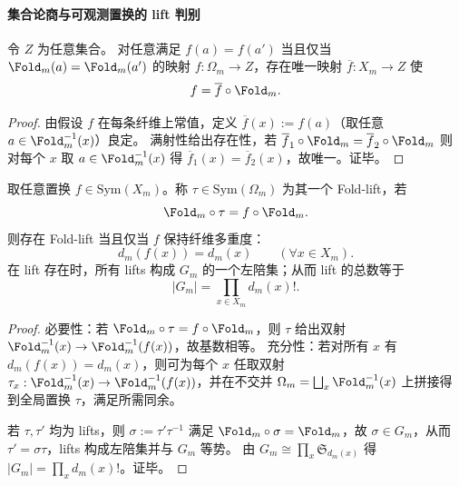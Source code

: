 \paragraph{集合论商与可观测置换的 lift 判别}
\begin{proposition}[折叠作为集合论商的泛性质]\label{prop:op-algebra-fold-quotient-universal}
令 \(Z\) 为任意集合。
对任意满足 \(f(a)=f(a')\) 当且仅当 \(\Fold_m(a)=\Fold_m(a')\) 的映射 \(f:\Omega_m\to Z\)，存在唯一映射 \(\overline f:X_m\to Z\) 使
\[
f=\overline f\circ \Fold_m.
\]
\end{proposition}
\begin{proof}
由假设 \(f\) 在每条纤维上常值，定义 \(\overline f(x):=f(a)\)（取任意 \(a\in\Fold_m^{-1}(x)\)）良定。
满射性给出存在性，若 \(\overline f_1\circ\Fold_m=\overline f_2\circ\Fold_m\) 则对每个 \(x\) 取 \(a\in\Fold_m^{-1}(x)\) 得 \(\overline f_1(x)=\overline f_2(x)\)，故唯一。证毕。
\end{proof}

\begin{proposition}\label{prop:op-algebra-fold-visible-permutation-lifts}
取任意置换 \(f\in\mathrm{Sym}(X_m)\)。称 \(\tau\in\mathrm{Sym}(\Omega_m)\) 为其一个 Fold-lift，若
\[
\Fold_m\circ\tau=f\circ\Fold_m.
\]
则存在 Fold-lift 当且仅当 \(f\) 保持纤维多重度：
\[
d_m(f(x))=d_m(x)\qquad(\forall x\in X_m).
\]
在 lift 存在时，所有 lifts 构成 \(G_m\) 的一个左陪集；从而 lift 的总数等于
\[
|G_m|=\prod_{x\in X_m} d_m(x)!.
\]
\end{proposition}
\begin{proof}
必要性：若 \(\Fold_m\circ\tau=f\circ\Fold_m\)，则 \(\tau\) 给出双射 \(\Fold_m^{-1}(x)\to\Fold_m^{-1}(f(x))\)，故基数相等。
充分性：若对所有 \(x\) 有 \(d_m(f(x))=d_m(x)\)，则可为每个 \(x\) 任取双射 \(\tau_x:\Fold_m^{-1}(x)\to\Fold_m^{-1}(f(x))\)，并在不交并 \(\Omega_m=\bigsqcup_x\Fold_m^{-1}(x)\) 上拼接得到全局置换 \(\tau\)，满足所需同余。
\par
若 \(\tau,\tau'\) 均为 lifts，则 \(\sigma:=\tau'\tau^{-1}\) 满足 \(\Fold_m\circ\sigma=\Fold_m\)，故 \(\sigma\in G_m\)，从而 \(\tau'=\sigma\tau\)，lifts 构成左陪集并与 \(G_m\) 等势。
由 \(G_m\cong\prod_x \mathfrak S_{d_m(x)}\) 得 \(|G_m|=\prod_x d_m(x)!\)。证毕。
\end{proof}





\endinput
